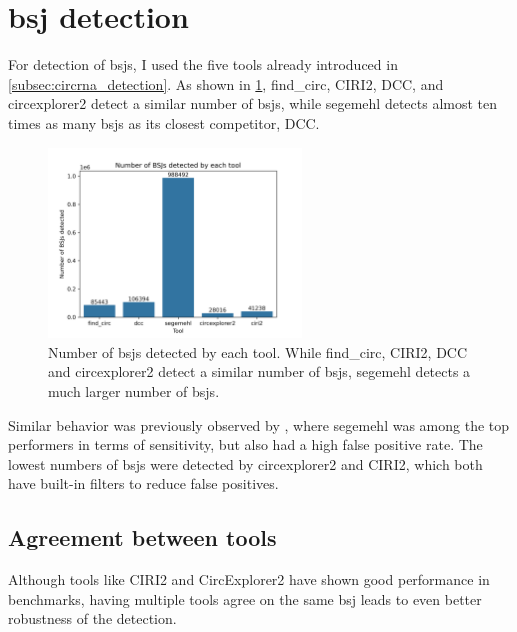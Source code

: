 \section{\Acrfull{bsj} detection}

For detection of \glspl{bsj}, I used the five tools already introduced in
\cref{subsec:circrna_detection}.
As shown in \cref{fig:detection_bars}, find\_circ, CIRI2, DCC, and
circexplorer2 detect a similar number of \glspl{bsj}, while segemehl detects
almost ten times as many \glspl{bsj} as its closest competitor, DCC.

\begin{figure}[H] \centering

    \includegraphics[width=0.6\textwidth]{chapters/4_results_and_discussion/figures/detection/n_bsjs_detected.png}
    \caption{Number of \glspl{bsj} detected by each tool.
        While find\_circ, CIRI2, DCC and circexplorer2 detect a similar number of
        \glspl{bsj}, segemehl detects a much larger number of \glspl{bsj}.
    }
    \label{fig:detection_bars}
\end{figure}
Similar behavior was previously observed by \textcite{zeng_comprehensive_2017},
where segemehl was among the top performers in terms of sensitivity, but also
had a high false positive rate.
The lowest numbers of \glspl{bsj} were detected by circexplorer2 and CIRI2,
which both have built-in filters to reduce false
positives\supercite{zhang_diverse_2016,gao_circular_2018}.

\subsection{Agreement between tools}

Although tools like CIRI2 and CircExplorer2 have shown good performance in
benchmarks\supercite{zeng_comprehensive_2017}, having multiple tools agree on
the same \gls{bsj} leads to even better robustness of the
detection\supercite{hansen_comparison_2016}.

